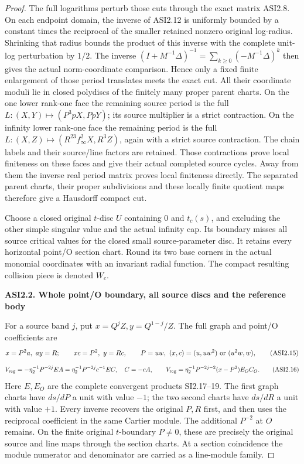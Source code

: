 \begin{proof}
The full logarithms perturb those cuts through the exact matrix
ASI2.8. On each endpoint domain, the inverse of ASI2.12 is
uniformly bounded by a constant times the reciprocal of the
smaller retained nonzero original log-radius. Shrinking that
radius bounds the product of this inverse with the complete
unit-log perturbation by \(1/2\). The inverse
\((I+M^{-1}\Delta)^{-1}=\sum_{k\geq0}(-M^{-1}\Delta)^k\)
then gives the actual norm-coordinate comparison. Hence only
a fixed finite enlargement of those period translates meets
the exact cut. All their coordinate moduli lie in closed
polydiscs of the finitely many proper parent charts.
On the one lower rank-one face the remaining source period is
the full \(L:(X,Y)\mapsto(P^3pX,PpY)\); its source multiplier
is a strict contraction. On the infinity lower rank-one face
the remaining period is the full \(L:(X,Z)\mapsto
(R^{23}f_\infty^2X,R^3Z)\), again with a strict source
contraction. The chain labels and their source/line factors
are retained. Those contractions prove local finiteness on
these faces and give their actual completed source cycles.
Away from them the inverse real period matrix proves local
finiteness directly. The separated parent charts, their
proper subdivisions and these locally finite quotient maps
therefore give a Hausdorff compact cut.

Choose a closed original \(t\)-disc \(U\) containing \(0\)
and \(t_c(s)\), and excluding the other simple singular value
and the actual infinity cap. Its boundary misses all source
critical values for the closed small source-parameter disc.
It retains every horizontal point/O section chart. Round
its two base corners in the actual monomial coordinates
with an invariant radial function. The compact resulting
collision piece is denoted \(W_c\).

\par

\medskip\noindent\textbf{ASI2.2. Whole point/O boundary, all source discs and the reference body}

\par\nobreak

For a source band \(j\), put \(x=Q^jZ,y=Q^{1-j}/Z\).
The full graph and point/O coefficients are
\[
 x=P^2a,\ ay=R;\qquad xc=P^2,\ y=Rc,\qquad
 P=uw,\ (x,c)=(u,uw^2)\ \hbox{or }(u^2w,w),
 \tag{ASI2.15}
\]
\[
 V_{\rm reg}=-\eta_2^{-1}P^{-2j}E A
   =\eta_2^{-1}P^{-2j}c^{-1}EC,\quad C=-cA,
 \qquad
 V_{\rm reg}=\eta_2^{-1}P^{-2j-2}(x-P^2)E_OC_O.
 \tag{ASI2.16}
\]
Here \(E,E_O\) are the complete convergent products SI2.17--19.
The first graph charts have \(ds/dP\) a unit with value \(-1\);
the two second charts have \(ds/dR\) a unit with value \(+1\).
Every inverse recovers the original \(P,R\) first, and then
uses the reciprocal coefficient in the same Cartier module.
The additional \(P^{-2}\) at \(O\) remains. On the finite
original \(t\)-boundary \(P\ne0\), these are precisely the
original source and line maps through the section charts.
At a section coincidence the module numerator and denominator
are carried as a line-module family.


\end{proof}
